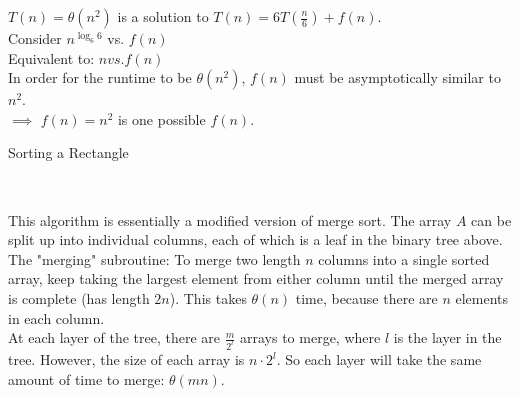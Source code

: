 \documentclass[12pt,twoside]{article}
\begin{document}
\begin{problems}
\begin{problemparts}
\bigskip $T(n) = \theta(n^{2})$ is a solution to $T(n) = 6T(\frac{n}{6}) + f(n)$. \\


\problempart Consider $n^{\log_6 6}$ vs. $f(n) $ \\
Equivalent to:  $n vs. f(n)$ \\
In order for the runtime to be $\theta(n^2)$, $f(n)$ must be asymptotically similar to $n^2$. \\
$\implies$ $f(n)=n^2$ is one possible $f(n)$.

\end{problemparts}

\problem  %

\begin{problemparts}


\problempart Sorting a Rectangle



 \\

\bigskip
\bigskip

This algorithm is essentially a modified version of merge sort. The array $A$ can be split up into individual columns, each of which is a leaf in the binary tree above. \\

The "merging" subroutine: To merge two length $n$ columns into a single sorted array, keep taking the largest element from either column until the merged array is complete (has length $2n$). This takes $\theta(n)$ time, because there are $n$ elements in each column. \\

At each layer of the tree, there are $\frac{m}{2^l}$ arrays to merge, where $l$ is the layer in the tree. However, the size of each array is $n \cdot 2^l$. So each layer will take the same amount of time to merge: $\theta(mn)$. \\


\end{problemparts}
\end{problems}
\end{document}
